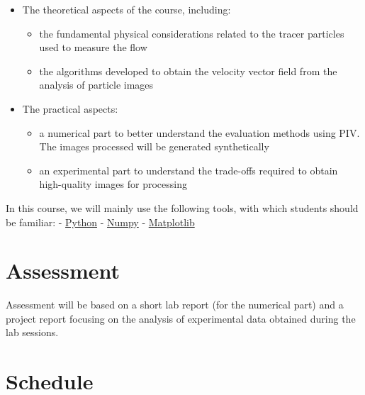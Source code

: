 \documentclass[
  english,
  letterpaper,
  numbers=noendperiod,
  DIV=13]{scrreprt}
\providecommand{\tightlist}{%
  \setlength{\itemsep}{0pt}\setlength{\parskip}{0pt}}
\begin{document}
\begin{itemize}
\tightlist
\item
  The theoretical aspects of the course, including:

  \begin{itemize}
  \tightlist
  \item
    the fundamental physical considerations related to the tracer
    particles used to measure the flow
  \item
    the algorithms developed to obtain the velocity vector field from
    the analysis of particle images
  \end{itemize}
\item
  The practical aspects:

  \begin{itemize}
  \tightlist
  \item
    a numerical part to better understand the evaluation methods using
    PIV. The images processed will be generated synthetically
  \item
    an experimental part to understand the trade-offs required to obtain
    high-quality images for processing
  \end{itemize}
\end{itemize}

In this course, we will mainly use the following tools, with which
students should be familiar: - \href{https://www.python.org/}{Python} -
\href{https://numpy.org}{Numpy} -
\href{https://matplotlib.org}{Matplotlib}


\chapter*{Assessment}\label{assessment}


Assessment will be based on a short lab report (for the numerical part)
and a project report focusing on the analysis of experimental data
obtained during the lab sessions.


\chapter*{Schedule}\label{schedule}

\end{document}
